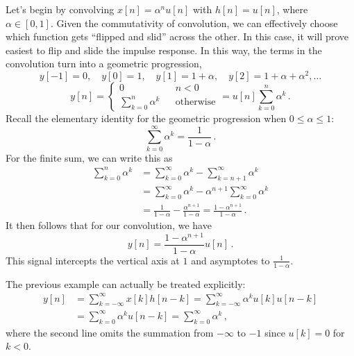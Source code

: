 %
\begin{exmp}
  Let's begin by convolving $x[n] = \alpha^n u[n]$ with $h[n] = u[n]$, where
  $\alpha\in [0,1]$. Given the commutativity of convolution, we can effectively
  choose which function gets ``flipped and slid'' across the other. In this case,
  it will prove easiest to flip and slide the impulse response. In this way, the terms
  in the convolution turn into a geometric progression,
  \begin{displaymath}
    y[-1] = 0, \quad y[0] = 1, \quad y[1] = 1 + \alpha, \quad y[2] = 1 + \alpha + \alpha^2, \hdots
  \end{displaymath}
  \begin{equation}
    y[n] = \left\{\begin{array}{ccl}
    0 & & n < 0 \\
    \sum_{k=0}^n \alpha^k & & \mathrm{otherwise}
    \end{array}\right. = u[n]\sum_{k=0}^n \alpha^k \,.
  \end{equation}
  Recall the elementary identity for the geometric progression when $0\leq\alpha\leq 1$:
  \begin{displaymath}
    \sum_{k=0}^\infty \alpha^k = \frac{1}{1 - \alpha} \,.
  \end{displaymath}
  For the finite sum, we can write this as
  \begin{align*}
    \sum_{k=0}^n \alpha^k &= \sum_{k=0}^\infty \alpha^k - \sum_{k=n+1}^\infty \alpha^k \\
    &= \sum_{k=0}^\infty \alpha^k - \alpha^{n+1}\sum_{k=0}^\infty \alpha^k \\
    &= \frac{1}{1-\alpha} - \frac{\alpha^{n+1}}{1-\alpha} = \frac{1 - \alpha^{n+1}}{1 - \alpha} \,.
  \end{align*}
  It then follows that for our convolution, we have
  \begin{equation}
    y[n] = \frac{1 - \alpha^{n+1}}{1 - \alpha} u[n] \,.
  \end{equation}
  This signal intercepts the vertical axis at $1$ and asymptotes to $\frac{1}{1-\alpha}$.
\end{exmp}
%
\begin{exmp}
  The previous example can actually be treated explicitly:
  \begin{align*}
    y[n] &= \sum_{k=-\infty}^\infty x[k]h[n-k] = \sum_{k=-\infty}^\infty \alpha^k u[k] u[n-k] \\
    &= \sum_{k=0}^\infty \alpha^k u[n-k] = \sum_{k=0}^\infty \alpha^k \,,
  \end{align*}
  where the second line omits the summation from $-\infty$ to $-1$ since $u[k] = 0$ for $k < 0$.
\end{exmp}
